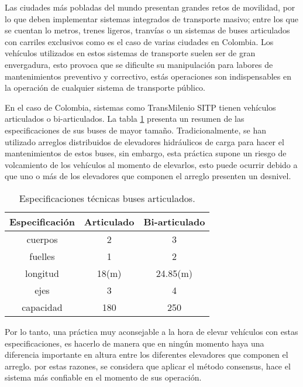Las ciudades más pobladas del mundo presentan grandes retos de movilidad, por lo que deben implementar sistemas integrados de transporte masivo; entre los que se cuentan lo metros, trenes ligeros, tranvías o un sistemas de buses articulados con carriles exclusivos como es el caso de varias ciudades en Colombia.
Los vehículos utilizados en estos sistemas de transporte suelen ser de gran envergadura, esto provoca que se dificulte su manipulación para labores de mantenimientos preventivo y correctivo, estás operaciones son indispensables en la operación de cualquier sistema de transporte público.

En el caso de Colombia, sistemas como TransMilenio SITP tienen vehículos articulados o bi-articulados. La tabla \ref{table:busesTM} presenta un resumen de las especificaciones de sus buses de mayor tamaño. Tradicionalmente, se han utilizado arreglos distribuidos de elevadores hidráulicos de carga para hacer el mantenimientos de estos buses, sin embargo, esta práctica supone un riesgo de volcamiento de los vehículos al momento de elevarlos, esto puede ocurrir debido a que uno o más de los elevadores que componen el arreglo presenten un desnivel.

\begin{table}[h]
	\centering
	\begin{tabular}{|c|c|c|}
		\hline
			Especificación&Articulado&Bi-articulado\\\hline
			cuerpos&2&3\\
			fuelles&1&2\\
			longitud&18(m)&24.85(m)\\
			ejes&3&4\\
			capacidad&180&250\\
		\hline
	\end{tabular}
	\caption{Especificaciones técnicas buses articulados.}
	\label{table:busesTM}
\end{table}

Por lo tanto, una  práctica muy aconsejable a la hora de elevar vehículos con estas especificaciones, es hacerlo de manera que en ningún momento haya una diferencia importante en altura entre los diferentes elevadores que componen el arreglo. por estas razones, se considera que aplicar el método consensus, hace el sistema más confiable en el momento de sus operación.